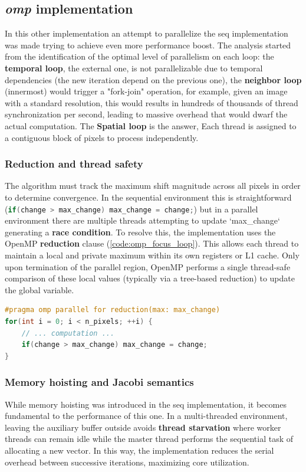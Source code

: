 \documentclass[10pt,twocolumn,letterpaper]{article}
\begin{document}
\subsection{\textit{omp} implementation}\label{subsec:omp}
In this other implementation an attempt to parallelize the seq implementation was made trying to achieve even more performance boost. The analysis started from the identification of the optimal level of parallelism on each loop: the \textbf{temporal loop}, the external one, is not parallelizable due to temporal dependencies (the new iteration depend on the previous one), the \textbf{neighbor loop} (innermost) would trigger a "fork-join" operation, for example, given an image with a standard resolution, this would results in hundreds of thousands of thread synchronization per second, leading to massive overhead that would dwarf the actual computation. The \textbf{Spatial loop} is the answer, Each thread is assigned to a contiguous block of pixels to process independently.

\subsubsection{Reduction and thread safety}
The algorithm must track the maximum shift magnitude across all pixels in order to determine convergence. In the sequential environment this is straightforward (\lstinline[language=C++]{if(change > max_change) max_change = change;}) but in a parallel environment there are multiple threads attempting to update `max\_change` generating a \textbf{race condition}. To resolve this, the implementation uses the OpenMP \textbf{reduction} clause (\cref{code:omp_focus_loop}).  This allows each thread to maintain a local and private maximum within its own registers or L1 cache. Only upon termination of the parallel region, OpenMP performs a single thread-safe comparison of these local values (typically via a tree-based reduction) to update the global variable. 

\begin{lstlisting}[language=C++, caption={Parallel decomposition of the spatial loop utilizing OpenMP max-reduction for thread-safe convergence tracking.}, label={code:omp_focus_loop}]
#pragma omp parallel for reduction(max: max_change)
for(int i = 0; i < n_pixels; ++i) {
    // ... computation ...
    if(change > max_change) max_change = change;
}
\end{lstlisting}
\subsubsection{Memory hoisting and Jacobi semantics}
While memory hoisting was introduced in the seq implementation, it becomes fundamental to the performance of this one. In a multi-threaded environment, leaving the auxiliary buffer outside avoids \textbf{thread starvation} where worker threads can remain idle while the master thread performs the sequential task of allocating a new vector. In this way, the implementation reduces the serial overhead between successive iterations, maximizing core utilization.
\end{document}
